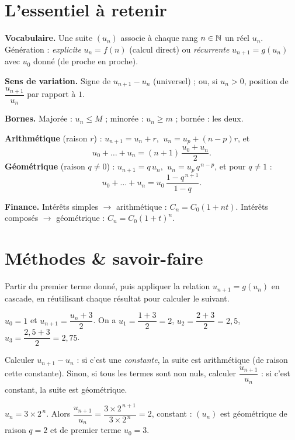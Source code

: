 \section{L'essentiel à retenir}

\begin{synthese}
\textbf{Vocabulaire.} Une suite $(u_n)$ associe à chaque rang $n\in\mathbb{N}$ un réel $u_n$.
Génération : \emph{explicite} $u_n=f(n)$ (calcul direct) ou \emph{récurrente}
$u_{n+1}=g(u_n)$ avec $u_0$ donné (de proche en proche).

\smallskip
\textbf{Sens de variation.} Signe de $u_{n+1}-u_n$ (universel) ; ou, si $u_n>0$,
position de $\dfrac{u_{n+1}}{u_n}$ par rapport à $1$.

\smallskip
\textbf{Bornes.} Majorée : $u_n\le M$ ; minorée : $u_n\ge m$ ; bornée : les deux.

\smallskip
\textbf{Arithmétique} (raison $r$) : $u_{n+1}=u_n+r$, $\ u_n=u_p+(n-p)r$, et
\[ u_0+\dots+u_n=(n+1)\,\dfrac{u_0+u_n}{2}. \]
\textbf{Géométrique} (raison $q\neq 0$) : $u_{n+1}=q\,u_n$, $\ u_n=u_p\,q^{\,n-p}$, et
pour $q\neq 1$ :
\[ u_0+\dots+u_n=u_0\,\dfrac{1-q^{\,n+1}}{1-q}. \]

\smallskip
\textbf{Finance.} Intérêts simples $\to$ arithmétique : $C_n=C_0(1+nt)$.
Intérêts composés $\to$ géométrique : $C_n=C_0(1+t)^n$.
\end{synthese}

\section{Méthodes \& savoir-faire}

Partir du premier terme donné, puis appliquer la relation $u_{n+1}=g(u_n)$ en cascade,
en réutilisant chaque résultat pour calculer le suivant.
\begin{exemple}
$u_0=1$ et $u_{n+1}=\dfrac{u_n+3}{2}$. On a $u_1=\dfrac{1+3}{2}=2$, $u_2=\dfrac{2+3}{2}=2{,}5$,
$u_3=\dfrac{2{,}5+3}{2}=2{,}75$.
\end{exemple}

Calculer $u_{n+1}-u_n$ : si c'est une \emph{constante}, la suite est arithmétique
(de raison cette constante). Sinon, si tous les termes sont non nuls, calculer
$\dfrac{u_{n+1}}{u_n}$ : si c'est constant, la suite est géométrique.
\begin{exemple}
$u_n=3\times 2^{\,n}$. Alors $\dfrac{u_{n+1}}{u_n}=\dfrac{3\times 2^{\,n+1}}{3\times 2^{\,n}}=2$,
constant : $(u_n)$ est géométrique de raison $q=2$ et de premier terme $u_0=3$.
\end{exemple}

